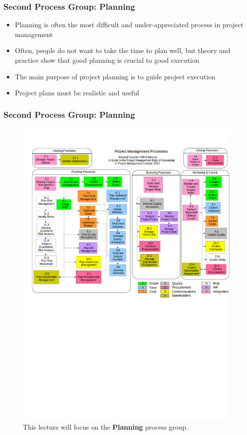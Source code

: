 \documentclass[aspectratio=169]{beamer}
\begin{document}

\begin{frame}
\frametitle{Second Process Group: Planning}
\begin{itemize}
\item Planning is often the most difficult and under-appreciated process in project management
\item Often, people do not want to take the time to plan well, but theory and practice show that good planning is crucial to good execution
\item The main purpose of project planning is to guide project execution
\item Project plans must be realistic and useful
\end{itemize}
\end{frame}


\begin{frame}
\frametitle{Second Process Group: Planning}
\begin{figure}
\caption{This lecture will focus on the \textbf{Planning} process group.}
\vspace{-0.8cm}
\includegraphics[scale=0.3]{mapping}
\end{figure}
\end{frame}
\end{document}
